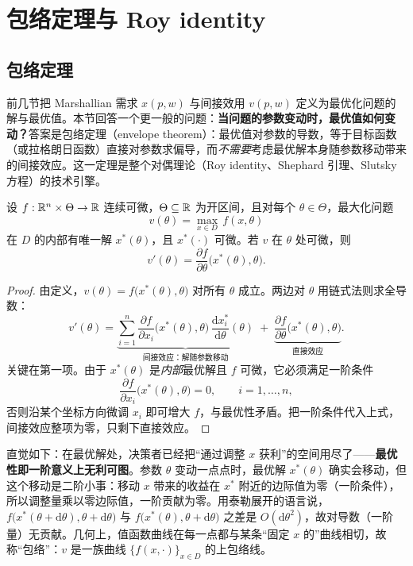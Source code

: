 \section{包络定理与 Roy identity}
\subsection{包络定理}

前几节把 Marshallian 需求 $x(p,w)$ 与间接效用 $v(p,w)$ 定义为最优化问题的解与最优值。本节回答一个更一般的问题：\textbf{当问题的参数变动时，最优值如何变动？}答案是包络定理（envelope theorem）：最优值对参数的导数，等于目标函数（或拉格朗日函数）直接对参数求偏导，而\emph{不需要}考虑最优解本身随参数移动带来的间接效应。这一定理是整个对偶理论（Roy identity、Shephard 引理、Slutsky 方程）的技术引擎。

\begin{theorem}\label{thm:env-general}
设 $f:\mathbb{R}^{n}\times\Theta\to\mathbb{R}$ 连续可微，$\Theta\subseteq\mathbb{R}$ 为开区间，且对每个 $\theta\in\Theta$，最大化问题
\[
 v(\theta)=\max_{x\in D}\,f(x,\theta)
\]
在 $D$ 的内部有唯一解 $x^*(\theta)$，且 $x^*(\cdot)$ 可微。若 $v$ 在 $\theta$ 处可微，则
\[
 \boxed{\;v'(\theta)=\frac{\partial f}{\partial \theta}\bigl(x^*(\theta),\theta\bigr).\;}
\]
\end{theorem}

\begin{proof}
由定义，$v(\theta)=f\bigl(x^*(\theta),\theta\bigr)$ 对所有 $\theta$ 成立。两边对 $\theta$ 用链式法则求全导数：
\[
 v'(\theta)
 =\underbrace{\sum_{i=1}^{n}\frac{\partial f}{\partial x_i}\bigl(x^*(\theta),\theta\bigr)\,\frac{\mathrm dx_i^*}{\mathrm d\theta}(\theta)}_{\text{间接效应：解随参数移动}}
 \;+\;\underbrace{\frac{\partial f}{\partial \theta}\bigl(x^*(\theta),\theta\bigr)}_{\text{直接效应}}.
\]
关键在第一项。由于 $x^*(\theta)$ 是\emph{内部}最优解且 $f$ 可微，它必须满足一阶条件
\[
 \frac{\partial f}{\partial x_i}\bigl(x^*(\theta),\theta\bigr)=0,\qquad i=1,\ldots,n,
\]
否则沿某个坐标方向微调 $x_i$ 即可增大 $f$，与最优性矛盾。把一阶条件代入上式，间接效应整项为零，只剩下直接效应。
\end{proof}

\begin{remark}[为什么间接项会消失]
直觉如下：在最优解处，决策者已经把“通过调整 $x$ 获利”的空间用尽了——\textbf{最优性即一阶意义上无利可图}。参数 $\theta$ 变动一点点时，最优解 $x^*(\theta)$ 确实会移动，但这个移动是二阶小事：移动 $x$ 带来的收益在 $x^*$ 附近的边际值为零（一阶条件），所以调整量乘以零边际值，一阶贡献为零。用泰勒展开的语言说，$f\bigl(x^*(\theta+\mathrm d\theta),\theta+\mathrm d\theta\bigr)$ 与 $f\bigl(x^*(\theta),\theta+\mathrm d\theta\bigr)$ 之差是 $O(\mathrm d\theta^2)$，故对导数（一阶量）无贡献。几何上，值函数曲线在每一点都与某条“固定 $x$ 的”曲线相切，故称“包络”：$v$ 是一族曲线 $\{f(x,\cdot)\}_{x\in D}$ 的上包络线。
\end{remark}

